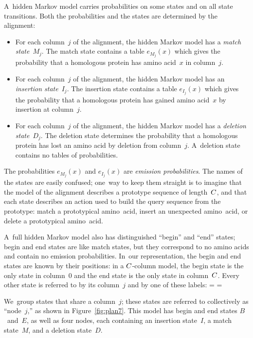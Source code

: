 \documentclass[]{jfp1}
\newcommand\alignwidth{\ensuremath C} %
\newcommand\figref[1]{Figure~\ref{fig:#1}}
\newif\ifverbatimsmall
\newcommand\smallverbatiminput[1]{%
  \verbatimsmalltrue
  \presvtopsep=\topsep
  \topsep=0.78\topsep
  \verbatimsmallfalse
  \topsep=\presvtopsep
}
\begin{document}
A~hidden Markov model carries probabilities on some states and on all
state transitions.
Both the probabilities and the states are determined by the alignment:
\begin{itemize}
\item
For each column~$j$ of the alignment, the hidden Markov model has a
\emph{match state}~$M_j$.
The match state contains a table $e_{M_j}(x)$ which gives the
 probability that a homologous protein has amino acid~$x$ in
 column~$j$.
\item 
For each column~$j$ of the alignment, the hidden Markov model has an
\emph{insertion state}~$I_j$.
The insertion state contains a table $e_{I_j}(x)$ which gives the
probability that a homologous protein has gained amino acid~$x$ by
insertion at column~$j$.
\item
For each column~$j$ of the alignment, the hidden Markov model has a
\emph{deletion state}~$D_j$.
The deletion state determines the probability that a homologous protein
has lost an amino acid by deletion from column~$j$.
A~deletion state contains no tables of probabilities.
\hfuzz=1.5pt %
\end{itemize}
The probabilities $e_{M_j}(x)$ and $e_{I_j}(x)$ are \emph{emission probabilities}.
The names of the states are easily confused;
one~way to keep them straight is to imagine that the model of the
alignment describes a prototype sequence of length~$\alignwidth$,
and that each state describes an action used to build the query
sequence from the prototype: 
match a prototypical amino~acid,
insert an unexpected amino~acid,
or
delete a prototypical amino~acid.


A~full hidden Markov model also has distinguished ``begin'' and ``end''
states; begin and end states are like match states, but they
correspond to no amino acids and contain no emission probabilities.
In~our representation, 
the begin and end states are known by their positions:
in a $\alignwidth$-column model, the begin state is the only state in
column~0 and the end state is the only state in column~$\alignwidth$.
Every other state is referred to by its column~$j$
and by one of these labels:
\smallverbatiminput{statelabel}
We~group states that share a column~$j$; these states are referred
to collectively as ``node~$j$,'' as shown in \figref{plan7}.
This model
has begin and end states $B$~and~$E$,
as well as four
nodes, each containing 
an insertion state~$I$, 
a match state~$M$, and a
deletion state~$D$.
\end{document}
